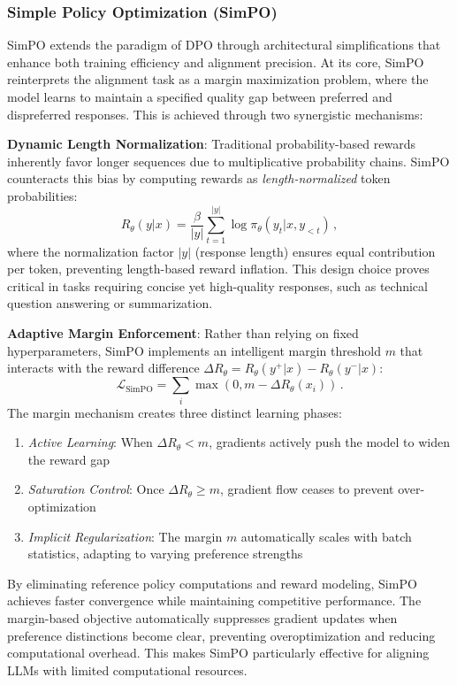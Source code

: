 \subsubsection{Simple Policy Optimization (SimPO)}
SimPO extends the paradigm of DPO through architectural simplifications that enhance both training efficiency and alignment precision. At its core, SimPO reinterprets the alignment task as a margin maximization problem, where the model learns to maintain a specified quality gap between preferred and dispreferred responses. This is achieved through two synergistic mechanisms:

\textbf{Dynamic Length Normalization}: Traditional probability-based rewards inherently favor longer sequences due to multiplicative probability chains. SimPO counteracts this bias by computing rewards as \textit{length-normalized} token probabilities:
$$R_\theta(y|x) = \frac{\beta}{|y|} \sum_{t=1}^{|y|} \log \pi_\theta(y_t|x, y_{<t})\,,$$ 
where the normalization factor $|y|$ (response length) ensures equal contribution per token, preventing length-based reward inflation. This design choice proves critical in tasks requiring concise yet high-quality responses, such as technical question answering or summarization.

\textbf{Adaptive Margin Enforcement}: Rather than relying on fixed hyperparameters, SimPO implements an intelligent margin threshold $m$ that interacts with the reward difference $\Delta R_\theta = R_\theta(y^+|x) - R_\theta(y^-|x)$:
    \[
    \mathcal{L}_{\text{SimPO}} = \sum_{i} \max\left(0, m - \Delta R_\theta(x_i)\right)\,.
    \]
The margin mechanism creates three distinct learning phases:
\begin{enumerate}
    \item \textit{Active Learning}: When $\Delta R_\theta < m$, gradients actively push the model to widen the reward gap
    \item \textit{Saturation Control}: Once $\Delta R_\theta \geq m$, gradient flow ceases to prevent over-optimization
    \item \textit{Implicit Regularization}: The margin $m$ automatically scales with batch statistics, adapting to varying preference strengths
\end{enumerate}
By eliminating reference policy computations and reward modeling, SimPO achieves faster convergence while maintaining competitive performance. The margin-based objective automatically suppresses gradient updates when preference distinctions become clear, preventing overoptimization and reducing computational overhead. This makes SimPO particularly effective for aligning LLMs with limited computational resources.

